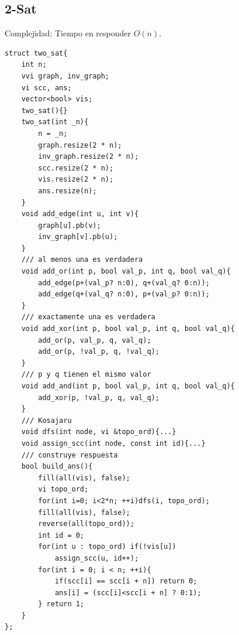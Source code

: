 \documentclass[10pt,spanish,mexico]{article}
\numberwithin{equation}{section}
\begin{document}
\begin{multicols}{2}
\subsection{2-Sat}
Complejidad: Tiempo en responder $O(n)$.
\begin{verbatim}
struct two_sat{
    int n;
    vvi graph, inv_graph;
    vi scc, ans;
    vector<bool> vis;
    two_sat(){}
    two_sat(int _n){
        n = _n;
        graph.resize(2 * n);
        inv_graph.resize(2 * n);
        scc.resize(2 * n);
        vis.resize(2 * n);
        ans.resize(n);
    }
    void add_edge(int u, int v){
        graph[u].pb(v);
        inv_graph[v].pb(u);
    }
    /// al menos una es verdadera
    void add_or(int p, bool val_p, int q, bool val_q){
        add_edge(p+(val_p? n:0), q+(val_q? 0:n));
        add_edge(q+(val_q? n:0), p+(val_p? 0:n));
    }
    /// exactamente una es verdadera
    void add_xor(int p, bool val_p, int q, bool val_q){
        add_or(p, val_p, q, val_q);
        add_or(p, !val_p, q, !val_q);
    }
    /// p y q tienen el mismo valor
    void add_and(int p, bool val_p, int q, bool val_q){
        add_xor(p, !val_p, q, val_q);
    }
    /// Kosajaru
    void dfs(int node, vi &topo_ord){...}
    void assign_scc(int node, const int id){...}
    /// construye respuesta
    bool build_ans(){
        fill(all(vis), false);
        vi topo_ord;
        for(int i=0; i<2*n; ++i)dfs(i, topo_ord);
        fill(all(vis), false);
        reverse(all(topo_ord));
        int id = 0;
        for(int u : topo_ord) if(!vis[u])
            assign_scc(u, id++);
        for(int i = 0; i < n; ++i){
            if(scc[i] == scc[i + n]) return 0;
            ans[i] = (scc[i]<scc[i + n] ? 0:1);
        } return 1;
    }
};
\end{verbatim}

\vspace{-1.2\baselineskip}
\hrulefill

\end{multicols}
\end{document}
